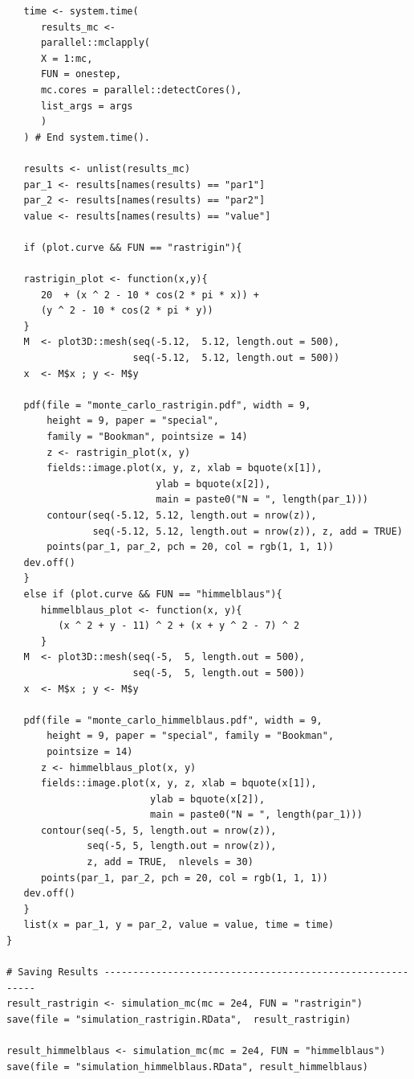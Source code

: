 \documentclass[10pt,letterpaper]{article}
\begin{document}
\begin{verbatim}
   time <- system.time(
      results_mc <-
      parallel::mclapply(
      X = 1:mc,
      FUN = onestep,
      mc.cores = parallel::detectCores(),
      list_args = args
      )
   ) # End system.time().

   results <- unlist(results_mc)
   par_1 <- results[names(results) == "par1"]
   par_2 <- results[names(results) == "par2"]
   value <- results[names(results) == "value"]

   if (plot.curve && FUN == "rastrigin"){

   rastrigin_plot <- function(x,y){
      20  + (x ^ 2 - 10 * cos(2 * pi * x)) +
      (y ^ 2 - 10 * cos(2 * pi * y))
   }
   M  <- plot3D::mesh(seq(-5.12,  5.12, length.out = 500),
                      seq(-5.12,  5.12, length.out = 500))
   x  <- M$x ; y <- M$y

   pdf(file = "monte_carlo_rastrigin.pdf", width = 9,
       height = 9, paper = "special",
       family = "Bookman", pointsize = 14)
       z <- rastrigin_plot(x, y)
       fields::image.plot(x, y, z, xlab = bquote(x[1]),
                          ylab = bquote(x[2]),
                          main = paste0("N = ", length(par_1)))
       contour(seq(-5.12, 5.12, length.out = nrow(z)),
               seq(-5.12, 5.12, length.out = nrow(z)), z, add = TRUE)
       points(par_1, par_2, pch = 20, col = rgb(1, 1, 1))
   dev.off()
   }
   else if (plot.curve && FUN == "himmelblaus"){
      himmelblaus_plot <- function(x, y){
         (x ^ 2 + y - 11) ^ 2 + (x + y ^ 2 - 7) ^ 2
      }
   M  <- plot3D::mesh(seq(-5,  5, length.out = 500),
                      seq(-5,  5, length.out = 500))
   x  <- M$x ; y <- M$y

   pdf(file = "monte_carlo_himmelblaus.pdf", width = 9,
       height = 9, paper = "special", family = "Bookman",
       pointsize = 14)
      z <- himmelblaus_plot(x, y)
      fields::image.plot(x, y, z, xlab = bquote(x[1]),
                         ylab = bquote(x[2]),
                         main = paste0("N = ", length(par_1)))
      contour(seq(-5, 5, length.out = nrow(z)),
              seq(-5, 5, length.out = nrow(z)),
              z, add = TRUE,  nlevels = 30)
      points(par_1, par_2, pch = 20, col = rgb(1, 1, 1))
   dev.off()
   }
   list(x = par_1, y = par_2, value = value, time = time)
}

# Saving Results ----------------------------------------------------------
result_rastrigin <- simulation_mc(mc = 2e4, FUN = "rastrigin")
save(file = "simulation_rastrigin.RData",  result_rastrigin)

result_himmelblaus <- simulation_mc(mc = 2e4, FUN = "himmelblaus")
save(file = "simulation_himmelblaus.RData", result_himmelblaus)
\end{verbatim}
\end{document}
